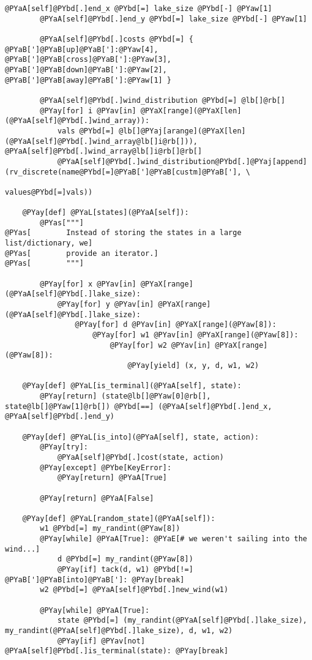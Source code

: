 \begin{Verbatim}[commandchars=@\[\]]
        @PYaA[self]@PYbd[.]end_x @PYbd[=] lake_size @PYbd[-] @PYaw[1]
        @PYaA[self]@PYbd[.]end_y @PYbd[=] lake_size @PYbd[-] @PYaw[1]

        @PYaA[self]@PYbd[.]costs @PYbd[=] { @PYaB[']@PYaB[up]@PYaB[']:@PYaw[4], @PYaB[']@PYaB[cross]@PYaB[']:@PYaw[3], @PYaB[']@PYaB[down]@PYaB[']:@PYaw[2], @PYaB[']@PYaB[away]@PYaB[']:@PYaw[1] }

        @PYaA[self]@PYbd[.]wind_distribution @PYbd[=] @lb[]@rb[]
        @PYay[for] i @PYav[in] @PYaX[range](@PYaX[len](@PYaA[self]@PYbd[.]wind_array)):
            vals @PYbd[=] @lb[]@PYaj[arange](@PYaX[len](@PYaA[self]@PYbd[.]wind_array@lb[]i@rb[])), @PYaA[self]@PYbd[.]wind_array@lb[]i@rb[]@rb[]
            @PYaA[self]@PYbd[.]wind_distribution@PYbd[.]@PYaj[append](rv_discrete(name@PYbd[=]@PYaB[']@PYaB[custm]@PYaB['], \
                                                    values@PYbd[=]vals))

    @PYay[def] @PYaL[states](@PYaA[self]):
        @PYas["""]
@PYas[        Instead of storing the states in a large list/dictionary, we]
@PYas[        provide an iterator.]
@PYas[        """]

        @PYay[for] x @PYav[in] @PYaX[range](@PYaA[self]@PYbd[.]lake_size):
            @PYay[for] y @PYav[in] @PYaX[range](@PYaA[self]@PYbd[.]lake_size):
                @PYay[for] d @PYav[in] @PYaX[range](@PYaw[8]):
                    @PYay[for] w1 @PYav[in] @PYaX[range](@PYaw[8]):
                        @PYay[for] w2 @PYav[in] @PYaX[range](@PYaw[8]):
                            @PYay[yield] (x, y, d, w1, w2)

    @PYay[def] @PYaL[is_terminal](@PYaA[self], state):
        @PYay[return] (state@lb[]@PYaw[0]@rb[], state@lb[]@PYaw[1]@rb[]) @PYbd[==] (@PYaA[self]@PYbd[.]end_x, @PYaA[self]@PYbd[.]end_y)

    @PYay[def] @PYaL[is_into](@PYaA[self], state, action):
        @PYay[try]:
            @PYaA[self]@PYbd[.]cost(state, action)
        @PYay[except] @PYbe[KeyError]:
            @PYay[return] @PYaA[True]

        @PYay[return] @PYaA[False]

    @PYay[def] @PYaL[random_state](@PYaA[self]):
        w1 @PYbd[=] my_randint(@PYaw[8])
        @PYay[while] @PYaA[True]: @PYaE[# we weren't sailing into the wind...]
            d @PYbd[=] my_randint(@PYaw[8])
            @PYay[if] tack(d, w1) @PYbd[!=] @PYaB[']@PYaB[into]@PYaB[']: @PYay[break]
        w2 @PYbd[=] @PYaA[self]@PYbd[.]new_wind(w1)

        @PYay[while] @PYaA[True]:
            state @PYbd[=] (my_randint(@PYaA[self]@PYbd[.]lake_size), my_randint(@PYaA[self]@PYbd[.]lake_size), d, w1, w2)
            @PYay[if] @PYav[not] @PYaA[self]@PYbd[.]is_terminal(state): @PYay[break]


\end{Verbatim}
